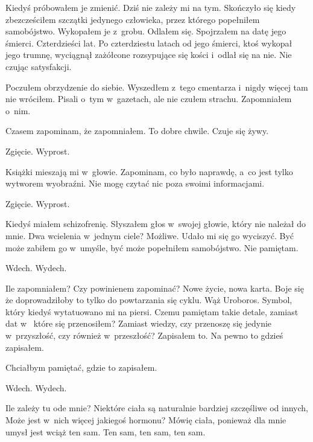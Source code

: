Kiedyś próbowałem je zmienić. Dziś nie zależy mi na tym. Skończyło się kiedy zbezcześciłem szczątki jedynego 
człowieka, przez którego popełniłem samobójstwo. Wykopałem je z~grobu. Odlałem się. Spojrzałem na datę jego śmierci.
Czterdzieści lat. Po czterdziestu latach od jego śmierci, ktoś wykopał jego trumnę, wyciągnął zażółcone rozsypujące 
się kości i~odlał się na nie. Nie czując satysfakcji.

Poczułem obrzydzenie do siebie. Wyszedłem z~tego cmentarza i~nigdy więcej tam nie wróciłem. Pisali o~tym w~gazetach, 
ale nie czułem strachu. Zapomniałem o~nim.

Czasem zapominam, że zapomniałem. To dobre chwile. Czuje się żywy.

\begin{itquote}
Zgięcie. Wyprost.
\end{itquote}

Książki mieszają mi w~głowie. Zapominam, co było naprawdę, a~co jest tylko wytworem wyobraźni. Nie mogę czytać nic 
poza swoimi informacjami. 

\begin{itquote}
Zgięcie. Wyprost.
\end{itquote}

Kiedyś miałem schizofrenię. Słyszałem głos w~swojej głowie, który nie należał do mnie. Dwa wcielenia w~jednym ciele? 
Możliwe. Udało mi się go wyciszyć. Być może zabiłem go w~umyśle, być może popełniłem samobójstwo. Nie pamiętam. 

\begin{itquote}
Wdech. Wydech.
\end{itquote}

Ile zapomniałem? Czy powinienem zapominać? Nowe życie, nowa karta. Boje się że doprowadziłoby to tylko do powtarzania 
się cyklu. Wąż Uroboros. Symbol, który kiedyś wytatuowano mi na piersi. Czemu pamiętam takie detale, zamiast dat w~
które się przenosiłem? Zamiast wiedzy, czy przenoszę się jedynie w~przyszłość, czy również w~przeszłość? Zapisałem 
to. Na pewno to gdzieś zapisałem.

Chciałbym pamiętać, gdzie to zapisałem.

\begin{itquote}
Wdech. Wydech.
\end{itquote}

Ile zależy tu ode mnie? Niektóre ciała są naturalnie bardziej szczęśliwe od innych, Może jest w~nich więcej jakiegoś 
hormonu? Mówię ciała, ponieważ dla mnie umysł jest wciąż ten sam. Ten sam, ten sam, ten sam.

